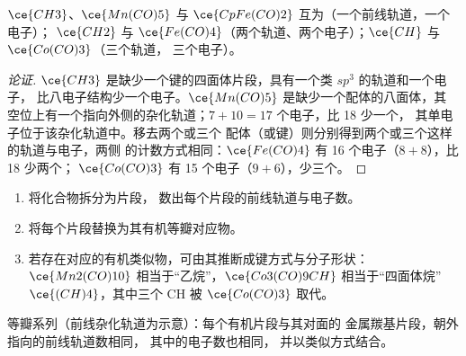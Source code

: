 \begin{proposition}[等瓣系列]\label{prop:b3:organometallic-bonding:isolobal}
$\ce{CH3}$、$\ce{Mn(CO)5}$ 与 $\ce{CpFe(CO)2}$ 互为（一个前线轨道，一个电子）；
$\ce{CH2}$ 与 $\ce{Fe(CO)4}$（两个轨道、两个电子）；$\ce{CH}$ 与 $\ce{Co(CO)3}$（三个轨道，
三个电子）。
\end{proposition}

\begin{proof}[论证]
$\ce{CH3}$ 是缺少一个键的四面体片段，具有一个类 $sp^3$ 的轨道和一个电子，
比八电子结构少一个电子。$\ce{Mn(CO)5}$ 是缺少一个配体的八面体，其
空位上有一个指向外侧的杂化轨道；$7 + 10 = 17$ 个电子，比 18 少一个，
其单电子位于该杂化轨道中。移去两个或三个
配体（或键）则分别得到两个或三个这样的轨道与电子，两侧
的计数方式相同：$\ce{Fe(CO)4}$ 有 16 个电子（$8 + 8$），比 18 少两个；
$\ce{Co(CO)3}$ 有 15 个电子（$9 + 6$），少三个。
\end{proof}

\begin{method}[通过等瓣替换预测结构]\label{met:b3:organometallic-bonding:isolobal}
\begin{enumerate}
  \item 将化合物拆分为片段，
        数出每个片段的前线轨道与电子数。
  \item 将每个片段替换为其有机等瓣对应物。
  \item 若存在对应的有机类似物，可由其推断成键方式与分子形状：
        $\ce{Mn2(CO)10}$ 相当于“乙烷”，$\ce{Co3(CO)9CH}$ 相当于“四面体烷” $\ce{(CH)4}$，其中三个 CH
        被 $\ce{Co(CO)3}$ 取代。
\end{enumerate}
\end{method}

\begin{omfigure}

{\small 等瓣系列（前线杂化轨道为示意）：每个有机片段与其对面的
金属羰基片段，朝外指向的前线轨道数相同，
其中的电子数也相同，
并以类似方式结合。}
\end{omfigure}

